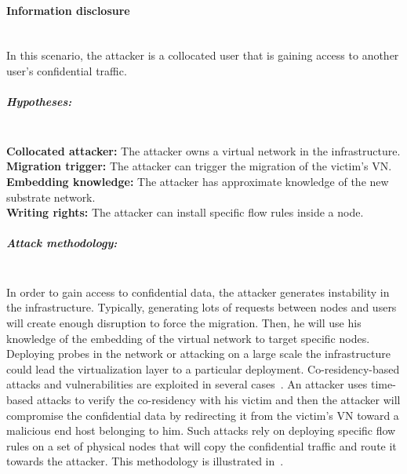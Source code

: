 \paragraph{Information disclosure}\textbf{\\}
In this scenario, the attacker is a collocated user that is gaining access to another user's confidential traffic. 
\subparagraph{Hypotheses:}\textbf{\\}
\textbf{Collocated attacker:} The attacker owns a virtual network in the infrastructure.\\
\textbf{Migration trigger:} The attacker can trigger the migration of the victim's VN.\\
\textbf{Embedding knowledge:} The attacker has approximate knowledge of the new substrate network.\\
\textbf{Writing rights:} The attacker can install specific flow rules inside a node.

\subparagraph{Attack methodology:}\textbf{\\}
In order to gain access to confidential data, the attacker generates instability in the infrastructure. Typically, generating lots of requests between nodes and users will create enough disruption to force the migration.
Then, he will use his knowledge of the embedding of the virtual network to target specific nodes.
Deploying probes in the network or attacking on a large scale the infrastructure could lead the virtualization layer to a particular deployment. Co-residency-based attacks and vulnerabilities are exploited in several cases~\cite{malicious-atya2017,nomad-Moon2015b,getoffmucloud-Ristenpart2009,stalling-atya2017}.
An attacker uses time-based attacks to verify the co-residency with his victim and then the attacker will compromise the confidential data by redirecting it from the victim's VN toward a malicious end host belonging to him.
Such attacks rely on deploying specific flow rules on a set of physical nodes that will copy the confidential traffic and route it towards the attacker.
This methodology is illustrated in~\cite{Costa2015,Sphinx-Dhawan2015}.


